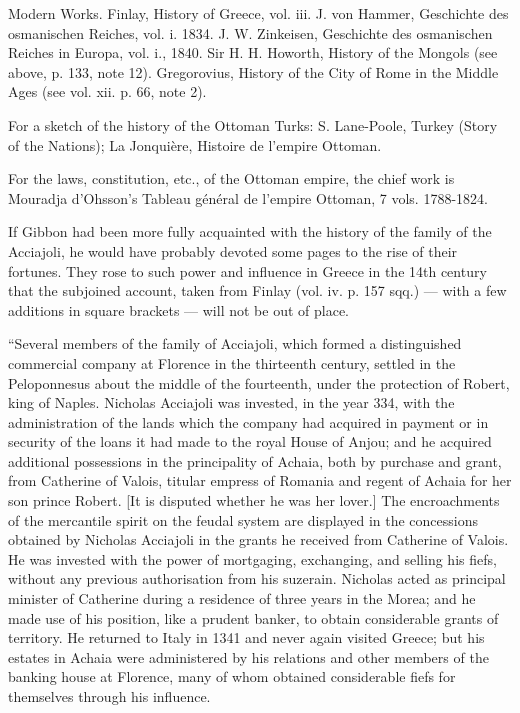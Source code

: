 Modern Works. Finlay, History of Greece, vol. iii. J. von Hammer, Geschichte des osmanischen Reiches, vol. i. 1834. J. W. Zinkeisen, Geschichte des osmanischen Reiches in Europa, vol. i., 1840. Sir H. H. Howorth, History of the Mongols (see above, p. 133, note 12). Gregorovius, History of the City of Rome in the Middle Ages (see vol. xii. p. 66, note 2).

For a sketch of the history of the Ottoman Turks: S. Lane-Poole, Turkey (Story of the Nations); La Jonquière, Histoire de l\texthebrew{}’empire Ottoman.

For the laws, constitution, etc., of the Ottoman empire, the chief work is Mouradja d\texthebrew{}’Ohsson\texthebrew{}’s Tableau général de l\texthebrew{}’empire Ottoman, 7 vols. 1788-1824.


If Gibbon had been more fully acquainted with the history of the family of the Acciajoli, he would have probably devoted some pages to the rise of their fortunes. They rose to such power and influence in Greece in the 14th century that the subjoined account, taken from Finlay (vol. iv. p. 157 sqq.) \texthebrew{—} with a few additions in square brackets \texthebrew{—} will not be out of place.

\texthebrew{“}Several members of the family of Acciajoli, which formed a distinguished commercial company at Florence in the thirteenth century, settled in the Peloponnesus about the middle of the fourteenth, under the protection of Robert, king of Naples. Nicholas Acciajoli was invested, in the year 334, with the administration of the lands which the company had acquired in payment or in security of the loans it had made to the royal House of Anjou; and he acquired additional possessions in the principality of Achaia, both by purchase and grant, from Catherine of Valois, titular empress of Romania and regent of Achaia for her son prince Robert. [It is disputed whether he was her lover.] The encroachments of the mercantile spirit on the feudal system are displayed in the concessions obtained by Nicholas Acciajoli in the grants he received from Catherine of Valois. He was invested with the power of mortgaging, exchanging, and selling his fiefs, without any previous authorisation from his suzerain. Nicholas acted as principal minister of Catherine during a residence of three years in the Morea; and he made use of his position, like a prudent banker, to obtain considerable grants of territory. He returned to Italy in 1341 and never again visited Greece; but his estates in Achaia were administered by his relations and other members of the banking house at Florence, many of whom obtained considerable fiefs for themselves through his influence.

